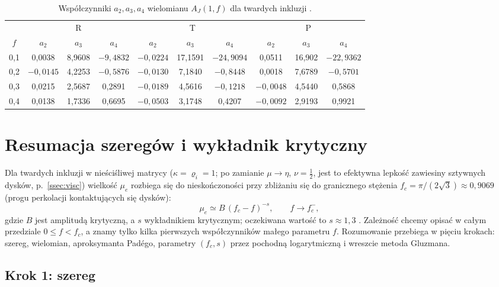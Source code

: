 \documentclass[12pt,a4paper,twoside,openright]{report}
\theoremstyle{definition}
\theoremstyle{remark}
\begin{document}
\begin{table}[h]
\centering\small
\caption{Współczynniki $a_2,a_3,a_4$ wielomianu $A_J(1,f)$ dla twardych inkluzji \cite{czapla2025computational}.}\label{tab:coef}
\begin{tabular}{@{}cccc|ccc|ccc@{}}
\toprule
 & \multicolumn{3}{c|}{R} & \multicolumn{3}{c|}{T} & \multicolumn{3}{c}{P}\\
$f$ & $a_2$ & $a_3$ & $a_4$ & $a_2$ & $a_3$ & $a_4$ & $a_2$ & $a_3$ & $a_4$\\ \midrule
0,1 & 0,0038 & 8,9608 & $-9{,}4832$ & $-0{,}0224$ & 17,1591 & $-24{,}9094$ & 0,0511 & 16,902 & $-22{,}9362$\\
0,2 & $-0{,}0145$ & 4,2253 & $-0{,}5876$ & $-0{,}0130$ & 7,1840 & $-0{,}8448$ & 0,0018 & 7,6789 & $-0{,}5701$\\
0,3 & 0,0215 & 2,5687 & 0,2891 & $-0{,}0189$ & 4,5616 & $-0{,}1218$ & $-0{,}0048$ & 4,5440 & 0,5868\\
0,4 & 0,0138 & 1,7336 & 0,6695 & $-0{,}0503$ & 3,1748 & 0,4207 & $-0{,}0092$ & 2,9193 & 0,9921\\ \bottomrule
\end{tabular}
\end{table}


\chapter{Resumacja szeregów i wykładnik krytyczny}\label{sec:resum}

Dla twardych inkluzji w nieściśliwej matrycy ($\kappa=\varrho_i=1$; po zamianie $\mu\to\eta$, $\nu=\tfrac12$, jest to efektywna lepkość zawiesiny sztywnych dysków, p.~\ref{ssec:visc}) wielkość $\mu_e$ rozbiega się do nieskończoności przy zbliżaniu się do granicznego stężenia $f_c=\pi/(2\sqrt3)\approx0{,}9069$ (progu perkolacji kontaktujących się dysków):
\begin{equation}\label{eq:crit}
\mu_e\simeq B\,(f_c-f)^{-s},\qquad f\to f_c^-,
\end{equation}
gdzie $B$ jest amplitudą krytyczną, a $s$ wykładnikiem krytycznym; oczekiwana wartość to $s\approx1{,}3$ \cite{czapla2025computational}. Zależność chcemy opisać w całym przedziale $0\le f<f_c$, a znamy tylko kilka pierwszych współczynników małego parametru $f$. Rozumowanie przebiega w pięciu krokach: szereg, wielomian, aproksymanta Padégo, parametry $(f_c,s)$ przez pochodną logarytmiczną i wreszcie metoda Gluzmana.

\section{\texorpdfstring{Krok 1: szereg}{Krok 1: szereg}}
\end{document}
